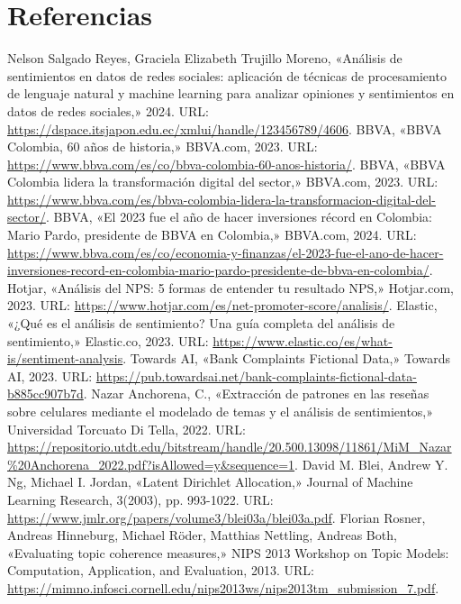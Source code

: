 \documentclass{matematicasud}
\begin{document}
\section{Referencias}
\begin{thebibliography}{99}
 Nelson Salgado Reyes, Graciela Elizabeth Trujillo Moreno, «Análisis de sentimientos en datos de redes sociales: aplicación de técnicas de procesamiento de lenguaje natural y machine learning para analizar opiniones y sentimientos en datos de redes sociales,» 2024. URL: \url{https://dspace.itsjapon.edu.ec/xmlui/handle/123456789/4606}.
 BBVA, «BBVA Colombia, 60 años de historia,» BBVA.com, 2023. URL: \url{https://www.bbva.com/es/co/bbva-colombia-60-anos-historia/}.
 BBVA, «BBVA Colombia lidera la transformación digital del sector,» BBVA.com, 2023. URL: \url{https://www.bbva.com/es/bbva-colombia-lidera-la-transformacion-digital-del-sector/}.
 BBVA, «El 2023 fue el año de hacer inversiones récord en Colombia: Mario Pardo, presidente de BBVA en Colombia,» BBVA.com, 2024. URL: \\\url{https://www.bbva.com/es/co/economia-y-finanzas/el-2023-fue-el-ano-de-hacer-inversiones-record-en-colombia-mario-pardo-presidente-de-bbva-en-colombia/}.
 Hotjar, «Análisis del NPS: 5 formas de entender tu resultado NPS,» Hotjar.com, 2023. URL: \url{https://www.hotjar.com/es/net-promoter-score/analisis/}.
 Elastic, «¿Qué es el análisis de sentimiento? Una guía completa del análisis de sentimiento,» Elastic.co, 2023. URL: \url{https://www.elastic.co/es/what-is/sentiment-analysis}.
 Towards AI, «Bank Complaints Fictional Data,» Towards AI, 2023. URL: \url{https://pub.towardsai.net/bank-complaints-fictional-data-b885cc907b7d}.
 Nazar Anchorena, C., «Extracción de patrones en las reseñas sobre celulares mediante el modelado de temas y el análisis de sentimientos,» Universidad Torcuato Di Tella, 2022. URL: \url{https://repositorio.utdt.edu/bitstream/handle/20.500.13098/11861/MiM_Nazar%20Anchorena_2022.pdf?isAllowed=y&sequence=1}.
 David M. Blei, Andrew Y. Ng, Michael I. Jordan, «Latent Dirichlet Allocation,» Journal of Machine Learning Research, 3(2003), pp. 993-1022. URL: \url{https://www.jmlr.org/papers/volume3/blei03a/blei03a.pdf}.
 Florian Rosner, Andreas Hinneburg, Michael Röder, Matthias Nettling, Andreas Both, «Evaluating topic coherence measures,» NIPS 2013 Workshop on Topic Models: Computation, Application, and Evaluation, 2013. URL: \url{https://mimno.infosci.cornell.edu/nips2013ws/nips2013tm_submission_7.pdf}.
\end{thebibliography}
\end{document}
